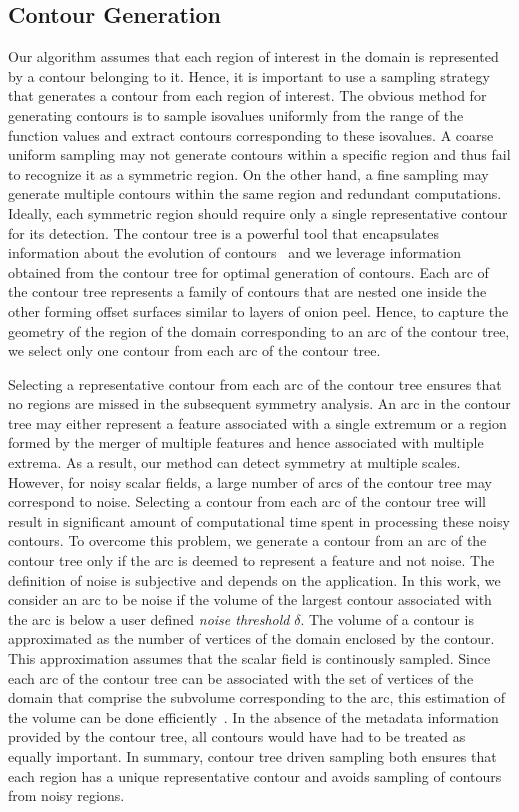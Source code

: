 \documentclass[review,journal]{vgtc}         %
\begin{document}
\subsection{Contour Generation}\label{congen}
Our algorithm assumes that each region of interest in the domain is represented by a contour belonging to it.
Hence, it is important to use a sampling strategy that generates a contour from each
region of interest. The obvious method for generating contours is 
to sample isovalues uniformly from the range of the function values and extract contours 
corresponding to these isovalues. A coarse uniform sampling may not generate contours 
within a specific region and thus fail to recognize it as a symmetric region. On the other hand, 
a fine sampling may generate multiple contours within the same region 
and redundant computations. Ideally, each symmetric region should require only a single 
representative contour for its detection.
The contour tree is a powerful tool that encapsulates information about the evolution of contours~\cite{CarrSP10} 
and we leverage information obtained from the contour tree for optimal generation of contours. 
Each arc of the contour tree represents a family of contours that are nested one inside the other
forming offset surfaces similar to layers of onion peel. Hence, to capture the geometry of the region of 
the domain corresponding to an arc of the contour tree, we select only one contour from each 
arc of the contour tree.

Selecting a representative contour from each arc of the contour tree ensures that no regions
are missed in the subsequent symmetry analysis. An arc in the contour tree may either
represent a feature associated with a single extremum or a region formed by the merger
of multiple features and hence associated with multiple extrema. As a result,
our method can detect symmetry at multiple scales. However, for noisy scalar fields, a large
number of arcs of the contour tree may correspond to noise. Selecting a contour from each
arc of the contour tree will result in significant amount of computational time spent in
processing these noisy contours. To overcome this problem,
we generate a contour from an arc of the contour tree only if the arc is deemed to represent
a feature and not noise. The definition of noise is subjective and depends on the application.
In this work, we consider an arc to be noise if the volume of the 
largest contour associated with the arc is below a user defined \emph{noise threshold} $\delta$. The volume of a
contour is approximated as the number of vertices of the domain enclosed by the contour. 
{\color{blue}This approximation assumes that the scalar field is continously sampled.}
Since each arc of the contour tree can be associated with the set of vertices of the domain 
that comprise the subvolume corresponding to the arc, this estimation of the volume can be done 
efficiently~\cite{CarrSP10}. In the absence of the metadata information provided by the contour tree,
all contours would have had to be treated as equally important. In summary, contour tree driven sampling 
both ensures that each region has a unique representative contour and avoids sampling of contours from noisy regions.
\end{document}
